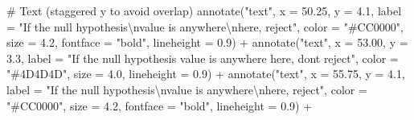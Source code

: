 \documentclass[
  letterpaper,
  DIV=11,
  numbers=noendperiod]{scrreprt}
\newenvironment{Shaded}{\begin{snugshade}}{\end{snugshade}}
\newcommand{\AttributeTok}[1]{\textcolor[rgb]{0.40,0.45,0.13}{#1}}
\newcommand{\CommentTok}[1]{\textcolor[rgb]{0.37,0.37,0.37}{#1}}
\newcommand{\FloatTok}[1]{\textcolor[rgb]{0.68,0.00,0.00}{#1}}
\newcommand{\FunctionTok}[1]{\textcolor[rgb]{0.28,0.35,0.67}{#1}}
\newcommand{\NormalTok}[1]{\textcolor[rgb]{0.00,0.23,0.31}{#1}}
\newcommand{\SpecialCharTok}[1]{\textcolor[rgb]{0.37,0.37,0.37}{#1}}
\newcommand{\StringTok}[1]{\textcolor[rgb]{0.13,0.47,0.30}{#1}}
\begin{document}
\begin{Shaded}
\begin{Highlighting}[]
  \CommentTok{\# Text (staggered y to avoid overlap)}
  \FunctionTok{annotate}\NormalTok{(}\StringTok{"text"}\NormalTok{, }\AttributeTok{x =} \FloatTok{50.25}\NormalTok{, }\AttributeTok{y =} \FloatTok{4.1}\NormalTok{,}
           \AttributeTok{label =} \StringTok{"If the null hypothesis}\SpecialCharTok{\textbackslash{}n}\StringTok{value is anywhere}\SpecialCharTok{\textbackslash{}n}\StringTok{here, reject"}\NormalTok{,}
           \AttributeTok{color =} \StringTok{"\#CC0000"}\NormalTok{, }\AttributeTok{size =} \FloatTok{4.2}\NormalTok{, }\AttributeTok{fontface =} \StringTok{"bold"}\NormalTok{, }\AttributeTok{lineheight =} \FloatTok{0.9}\NormalTok{) }\SpecialCharTok{+}
  \FunctionTok{annotate}\NormalTok{(}\StringTok{"text"}\NormalTok{, }\AttributeTok{x =} \FloatTok{53.00}\NormalTok{, }\AttributeTok{y =} \FloatTok{3.3}\NormalTok{,}
           \AttributeTok{label =} \StringTok{"If the null hypothesis value is anywhere here, don\textquotesingle{}t reject"}\NormalTok{,}
           \AttributeTok{color =} \StringTok{"\#4D4D4D"}\NormalTok{, }\AttributeTok{size =} \FloatTok{4.0}\NormalTok{, }\AttributeTok{lineheight =} \FloatTok{0.9}\NormalTok{) }\SpecialCharTok{+}
  \FunctionTok{annotate}\NormalTok{(}\StringTok{"text"}\NormalTok{, }\AttributeTok{x =} \FloatTok{55.75}\NormalTok{, }\AttributeTok{y =} \FloatTok{4.1}\NormalTok{,}
           \AttributeTok{label =} \StringTok{"If the null hypothesis}\SpecialCharTok{\textbackslash{}n}\StringTok{value is anywhere}\SpecialCharTok{\textbackslash{}n}\StringTok{here, reject"}\NormalTok{,}
           \AttributeTok{color =} \StringTok{"\#CC0000"}\NormalTok{, }\AttributeTok{size =} \FloatTok{4.2}\NormalTok{, }\AttributeTok{fontface =} \StringTok{"bold"}\NormalTok{, }\AttributeTok{lineheight =} \FloatTok{0.9}\NormalTok{) }\SpecialCharTok{+}


\end{Highlighting}
\end{Shaded}
\end{document}
